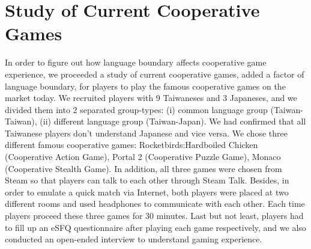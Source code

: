 \section{Study of Current Cooperative Games}


In order to figure out how language boundary affects cooperative game experience, we proceeded a study of current cooperative games, added a factor of language boundary, for players to play the famous cooperative games on the market today. We recruited players with 9 Taiwaneses and 3 Japaneses, and we divided them into 2 separated group-types: (i) common language group (Taiwan-Taiwan), (ii) different language group (Taiwan-Japan). We had confirmed that all Taiwanese players don't understand Japanese and vice versa. We chose three different famous cooperative games: Rocketbirds:Hardboiled Chicken (Cooperative Action Game), Portal 2 (Cooperative Puzzle Game), Monaco (Cooperative Stealth Game). In addition, all three games were chosen from Steam so that players can talk to each other through Steam Talk. Besides, in order to emulate a quick match via Internet, both players were placed at two different rooms and used headphones to communicate with each other. Each time players proceed these three games for 30 minutes. Last but not least, players had to fill up an eSFQ\cite{eSFQ} questionnaire after playing each game respectively, and we also conducted an open-ended interview to understand gaming experience. 

